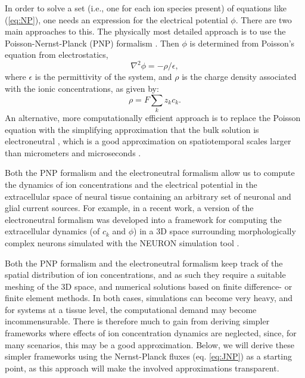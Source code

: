 \documentclass[preprint,11pt,authoryear]{elsarticle}
\begin{document}
In order to solve a set (i.e., one for each ion species present) of equations like (\ref{eq:NP}), one needs an expression for the electrical potential $\phi$. There are two main approaches to this. The physically most detailed approach is to use the Poisson-Nernst-Planck (PNP) formalism \citep{Leonetti1998, Leonetti2004, Lu2007, Lopreore2008, Nanninga2008, Pods2013, Gardner2015}. Then $\phi$ is determined from Poisson's equation from electrostatics, 
\begin{equation}
\nabla^2 \phi = -\rho/\epsilon, 
\label{eq:poisson}
\end{equation}
where $\epsilon$ is the permittivity of the system, and $\rho$ is the charge density associated with the ionic concentrations, as given by:
\begin{equation}
\rho = F \sum_k z_k c_k.
\label{eq:poisson}
\end{equation}
An alternative, more computationally efficient approach is to replace the Poisson equation with the simplifying approximation that the bulk solution is electroneutral \citep{Mori2008, Mori2009, Mori2009a, Mori2011, Halnes2015, Halnes2013, Halnes2015arxiv, Pods2017, Niederer2013, OConnell2016, Solbra2018}, which is a good approximation on spatiotemporal scales larger than micrometers and microseconds \citep{Grodzinsky2011, Pods2017, Solbra2018}. 

Both the PNP formalism and the electroneutral formalism allow us to compute the dynamics of ion concentrations and the electrical potential in the extracellular space of neural tissue containing an arbitrary set of neuronal and glial current sources. For example, in a recent work, a version of the electroneutral formalism was developed into a framework for computing the extracellular dynamics (of $c_k$ and $\phi$) in a 3D space surrounding morphologically complex neurons simulated with the NEURON simulation tool \citep{Solbra2018}. 

Both the PNP formalism and the electroneutral formalism keep track of the spatial distribution of ion concentrations, and as such they require a suitable meshing of the 3D space, and numerical solutions based on finite difference- or finite element methods. In both cases, simulations can become very heavy, and for systems at a tissue level, the computational demand may become incommensurable. There is therefore much to gain from deriving simpler frameworks where effects of ion concentration dynamics are neglected, since, for many scenarios, this may be a good approximation. Below, we will derive these simpler frameworks using the Nernst-Planck fluxes (eq. \ref{eq:JNP}) as a starting point, as this approach will make the involved approximations transparent.
\end{document}
